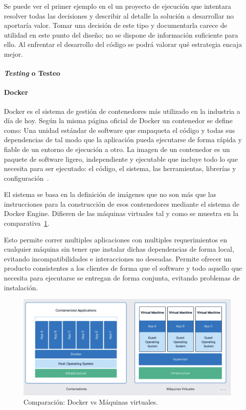 Se puede ver el primer ejemplo en el un proyecto de ejecución que intentara resolver todas las decisiones y describir al detalle la solución a desarrollar no aportaría valor.
Tomar una decisión de este tipo y documentarla carece de utilidad en este punto del diseño;
no se dispone de información suficiente para ello.
Al enfrentar el desarrollo del código se podrá valorar qué estrategia encaja mejor.

\paragraph{\textit{Testing} o Testeo}
    

\paragraph{Docker}

Docker es el sistema de gestión de contenedores más utilizado en la industria a día de hoy.
Según la misma página oficial de Docker un contenedor se define como: Una unidad estándar de software que empaqueta el código y todas sus dependencias de tal modo que la aplicación pueda ejecutarse de forma rápida y fiable de un entorno de ejecución a otro.
La imagen de un contenedor es un paquete de software ligero, independiente y ejecutable que incluye todo lo que necesita para ser ejecutado: el código, el sistema, las herramientas, librerías y configuración~\cite{docker}.

El sistema se basa en la definición de imágenes que no son más que las instrucciones para la construcción de esos contenedores mediante el sistema de Docker Engine.
Difieren de las máquinas virtuales tal y como se muestra en la comparativa~\cref{fig:Docker vs VM}.

Esto permite correr multiples aplicaciones con multiples requerimientos en cualquier máquina sin tener que instalar dichas dependencias de forma local, evitando incompatibilidades e interacciones no deseadas.
Permite ofrecer un producto consistentes a los clientes de forma que el software y todo aquello que necesita para ejecutarse se entregan de forma conjunta, evitando problemas de instalación.

\begin{figure}[H]
    \centering
    \includegraphics[height=0.3\textheight]{./part/Proyecto_ejecutivo/memoria_descriptiva/prestaciones/docker/img/dockerVsVM}
    \caption{Comparación: Docker vs Máquinas virtuales.\cite{docker}}\label{fig:Docker vs VM}
\end{figure}

